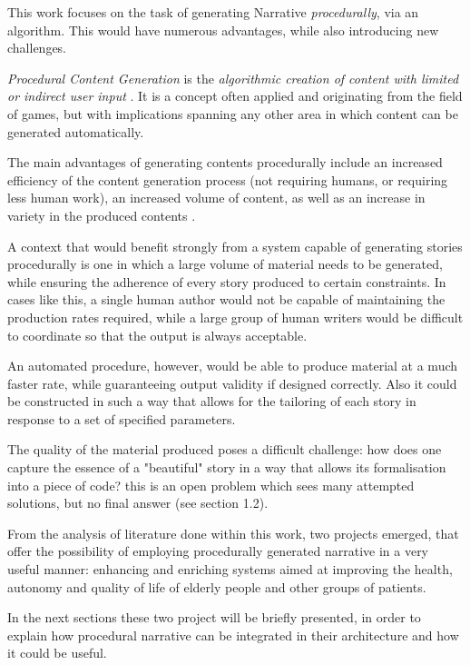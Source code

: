 \documentclass[12pt,a4paper,oneside]{report}
\begin{document}
This work focuses on the task of generating Narrative \textit{procedurally}, via an algorithm. This would have numerous advantages, while also introducing new challenges.

\bigskip

\textit{Procedural Content Generation} is the \textit{algorithmic creation of content with
limited or indirect user input} \cite{pcg}. It is a concept often applied and originating from the field of games, but with implications spanning any other area in which content can be generated automatically.

The main advantages of generating contents procedurally include an increased efficiency of the content generation process (not requiring humans, or requiring less human work), an increased volume of content, as well as an increase in variety in the produced contents \cite{pcg}.

\bigskip

A context that would benefit strongly from a system capable of generating stories procedurally is one in which a large volume of material needs to be generated, while ensuring the adherence of every story produced to certain constraints.  In cases like this, a single human author would not be capable of maintaining the production rates required, while a large group of human writers would be difficult to coordinate so that the output is always acceptable.

An automated procedure, however, would be able to produce material at a much faster rate, while guaranteeing output validity if designed correctly. Also it could be constructed in such a way that allows for the tailoring of each story in response to a set of specified parameters.

The quality of the material produced poses a difficult challenge: how does one capture the essence of a "beautiful" story in a way that allows its formalisation into a piece of code? this is an open problem which sees many attempted solutions, but no final answer (see section 1.2).

\bigskip

From the analysis of literature done within this work, two projects emerged, that offer the possibility of employing procedurally generated narrative in a very useful manner: enhancing and enriching systems aimed at improving the health, autonomy and quality of life of elderly people and other groups of patients.

In the next sections these two project will be briefly presented, in order to explain how procedural narrative can be integrated in their architecture and how it could be useful.
\end{document}
